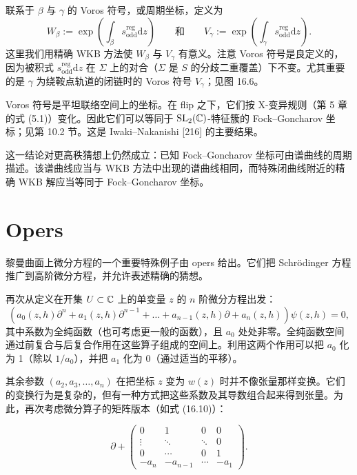 联系于 $\beta$ 与 $\gamma$ 的 Voros 符号，或周期坐标，定义为
\[
W_\beta:=\exp\left(\int_\beta s^{\mathrm{reg}}_{\mathrm{odd}}\mathrm{d}z\right)
\qquad\text{和}\qquad
V_\gamma:=\exp\left(\int_\gamma s^{\mathrm{reg}}_{\mathrm{odd}}\mathrm{d}z\right).
\]
这里我们用精确 WKB 方法使 $W_\beta$ 与 $V_\gamma$ 有意义。注意 Voros 符号是良定义的，因为被积式 $s^{\mathrm{reg}}_{\mathrm{odd}}\mathrm{d}z$ 在 $\Sigma$ 上的对合（$\Sigma$ 是 $S$ 的分歧二重覆盖）下不变。尤其重要的是 $\gamma$ 为绕鞍点轨道的闭链时的 Voros 符号 $V_\gamma$；见图 16.6。


Voros 符号是平坦联络空间上的坐标。在 flip 之下，它们按 X-变异规则（第 5 章的式 (5.1)）变化。因此它们可以等同于 $\operatorname{SL}_2(\mathbb{C})$-特征簇的 Fock–Goncharov 坐标；见第 10.2 节。这是 Iwaki–Nakanishi [216] 的主要结果。

这一结论对更高秩猜想上仍然成立：已知 Fock–Goncharov 坐标可由谱曲线的周期描述。该谱曲线应当与 WKB 方法中出现的谱曲线相同，而特殊闭曲线附近的精确 WKB 解应当等同于 Fock–Goncharov 坐标。

\section{Opers}

黎曼曲面上微分方程的一个重要特殊例子由 opers 给出。它们把 Schrödinger 方程推广到高阶微分方程，并允许表述精确的猜想。

再次从定义在开集 $U\subset\mathbb{C}$ 上的单变量 $z$ 的 $n$ 阶微分方程出发：
\[
(a_0(z,h)\partial^n+a_1(z,h)\partial^{n-1}+\dots+a_{n-1}(z,h)\partial+a_n(z,h))\psi(z,h)=0,
\]
其中系数为全纯函数（也可考虑更一般的函数），且 $a_0$ 处处非零。全纯函数空间通过前复合与后复合作用在这些算子组成的空间上。利用这两个作用可以把 $a_0$ 化为 1（除以 $1/a_0$），并把 $a_1$ 化为 0（通过适当的平移）。

其余参数 $(a_2,a_3,\dots,a_n)$ 在把坐标 $z$ 变为 $w(z)$ 时并不像张量那样变换。它们的变换行为是复杂的，但有一种方式把这些系数及其导数组合起来得到张量。为此，再次考虑微分算子的矩阵版本（如式 (16.10)）：

\begin{equation}
\partial+
\begin{pmatrix}
0&1&0&0\\
\vdots&\ddots&\ddots&0\\
0&\cdots&0&1\\
-a_n&-a_{n-1}&\cdots&-a_1
\end{pmatrix}.
\tag{16.27}
\end{equation}

